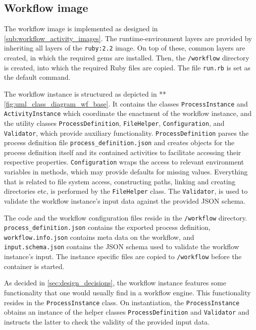   \subsection{Workflow image} %
  \label{sub:workflow_container}
    The workflow image is implemented as designed in \ref{sub:workflow_activity_images}. The runtime-environment layers are provided by inheriting all layers of the \texttt{ruby:2.2} image. On top of these, common layers are created, in which the required gems are installed. Then, the \texttt{/workflow} directory is created, into which the required Ruby files are copied. The file \texttt{run.rb} is set as the default command.

    The workflow instance is structured as depicted in ** \ref{fig:uml_class_diagram_wf_base}. It contains the classes \texttt{ProcessInstance} and \texttt{ActivityInstance} which coordinate the enactment of the workflow instance, and the utility classes \texttt{ProcessDefinition}, \texttt{FileHelper}, \texttt{Configuration}, and \texttt{Validator}, which provide auxiliary functionality.
    \texttt{ProcessDefinition} parses the process definition file \texttt{process\_definition.json} and creates objects for the process definition itself and its contained activities to facilitate accessing their respective properties.
    \texttt{Configuration} wraps the access to relevant environment variables in methods, which may provide defaults for missing values. Everything that is related to file system access, \eg constructing paths, linking and creating directories etc, is performed by the \texttt{FileHelper} class. The \texttt{Validator}, is used to validate the workflow instance's input data against the provided \ac{JSON} schema.

    The code and the workflow configuration files reside in the \texttt{/workflow} directory. \texttt{pro\-cess\_de\-fi\-ni\-tion.json} contains the exported process definition, \texttt{workflow.info.json} contains meta data on the workflow, and \texttt{input.schema.json} contains the \ac{JSON} schema used to validate the workflow instance's input. The instance specific files are copied to \texttt{/workflow} before the container is started.

    As decided in \ref{sec:design_decisions}, the workflow instance features some functionality that one would usually find in a workflow engine. This functionality resides in the \texttt{ProcessInstance} class. On instantiation, the \texttt{ProcessInstance} obtains an instance of the helper classes \texttt{ProcessDefinition} and \texttt{Validator} and instructs the latter to check the validity of the provided input data.


